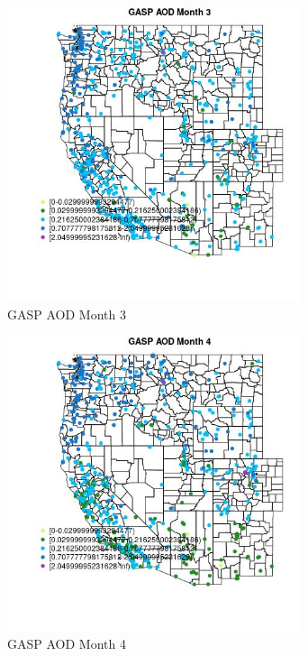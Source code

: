 \begin{figure} 
\centering  
\includegraphics[width=0.77\textwidth]{Code_Outputs/Report_ML_input_PM25_Step4_part_e_de_duplicated_aves_compiled_2019-05-21wNAs_MapObsMo3GASP_AOD.jpg} 
\caption{\label{fig:Report_ML_input_PM25_Step4_part_e_de_duplicated_aves_compiled_2019-05-21wNAsMapObsMo3GASP_AOD}GASP AOD Month 3} 
\end{figure} 
 

\clearpage 

\begin{figure} 
\centering  
\includegraphics[width=0.77\textwidth]{Code_Outputs/Report_ML_input_PM25_Step4_part_e_de_duplicated_aves_compiled_2019-05-21wNAs_MapObsMo4GASP_AOD.jpg} 
\caption{\label{fig:Report_ML_input_PM25_Step4_part_e_de_duplicated_aves_compiled_2019-05-21wNAsMapObsMo4GASP_AOD}GASP AOD Month 4} 
\end{figure} 
 

